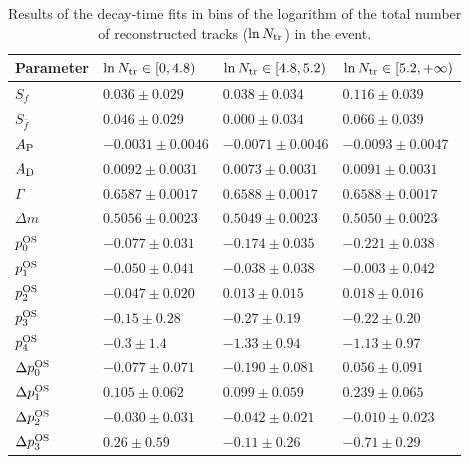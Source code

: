 \begin{table}
  \centering
  \caption{Results of the decay-time fits in bins of the logarithm of the total number of reconstructed tracks ($\ln N_{\rm tr}$) in the event.}
  \label{tab:timesplitsnTracks}
    \begin{tabular}{llll}
      \toprule
      Parameter & $\ln N_{\rm tr}\in[0,4.8)$ & $\ln N_{\rm tr}\in[4.8,5.2)$ & $\ln N_{\rm tr}\in[5.2,+\infty)$ \\
      \midrule
      $S_{f}$               & $0.036\pm0.029$      & $0.038\pm0.034$      & $0.116\pm0.039$  \\    
      $S_{\bar f}$          & $0.046\pm0.029$      & $0.000\pm0.034$      & $0.066\pm0.039$  \\ 
      \midrule
      $A_{\rm P}$               & $-0.0031\pm0.0046$    & $-0.0071\pm0.0046$    & $-0.0093\pm0.0047$\\
      $A_{\rm D}$               & $0.0092\pm0.0031$     & $0.0073\pm0.0031$     & $0.0091\pm0.0031$ \\ 
      \midrule
      $\Gamma$              & $0.6587\pm0.0017$     & $0.6588\pm0.0017$     & $0.6588\pm0.0017$ \\    
      $\Delta m$            & $0.5056\pm0.0023$     & $0.5049\pm0.0023$     & $0.5050\pm0.0023$ \\   
      \midrule
      $p_{0}^{\rm OS}$             & $-0.077\pm0.031$      & $-0.174\pm0.035$      & $-0.221\pm0.038$  \\    
      $p_{1}^{\rm OS}$             & $-0.050\pm0.041$      & $-0.038\pm0.038$      & $-0.003\pm0.042$  \\    
      $p_{2}^{\rm OS}$             & $-0.047\pm0.020$      & $0.013\pm0.015$       & $0.018\pm0.016$   \\    
      $p_{3}^{\rm OS}$             & $-0.15\pm0.28$        & $-0.27\pm0.19$        & $-0.22\pm0.20$    \\    
      $p_{4}^{\rm OS}$             & $-0.3\pm1.4$          & $-1.33\pm0.94$        & $-1.13\pm0.97$    \\ 
      $\Delta p_{0}^{\rm OS}$      & $-0.077\pm0.071$      & $-0.190\pm0.081$      & $0.056\pm0.091$   \\ 
      $\Delta p_{1}^{\rm OS}$      & $0.105\pm0.062$       & $0.099\pm0.059$       & $0.239\pm0.065$   \\    
      $\Delta p_{2}^{\rm OS}$      & $-0.030\pm0.031$      & $-0.042\pm0.021$      & $-0.010\pm0.023$  \\    
      $\Delta p_{3}^{\rm OS}$      & $0.26\pm0.59$         & $-0.11\pm0.26$        & $-0.71\pm0.29$    \\    

\end{tabular}
\end{table}

